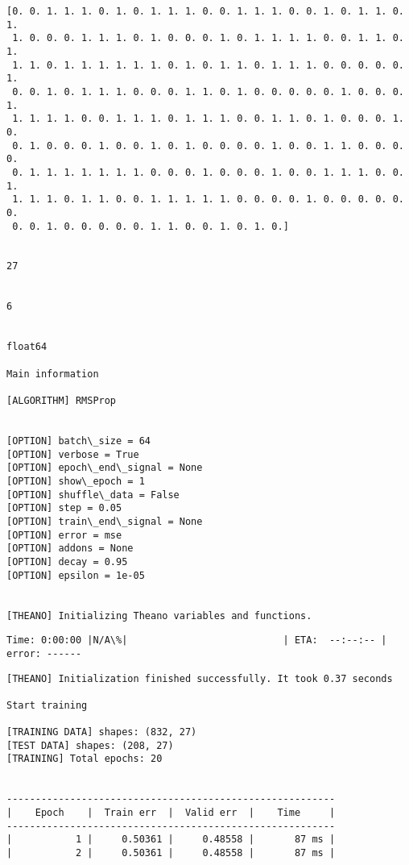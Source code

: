 \documentclass[11pt]{article}
\begin{document}
\begin{Verbatim}[commandchars=\\\{\}]
[0. 0. 1. 1. 1. 0. 1. 0. 1. 1. 1. 0. 0. 1. 1. 1. 0. 0. 1. 0. 1. 1. 0. 1.
 1. 0. 0. 0. 1. 1. 1. 0. 1. 0. 0. 0. 1. 0. 1. 1. 1. 1. 0. 0. 1. 1. 0. 1.
 1. 1. 0. 1. 1. 1. 1. 1. 1. 0. 1. 0. 1. 1. 0. 1. 1. 1. 0. 0. 0. 0. 0. 1.
 0. 0. 1. 0. 1. 1. 1. 0. 0. 0. 1. 1. 0. 1. 0. 0. 0. 0. 0. 1. 0. 0. 0. 1.
 1. 1. 1. 1. 0. 0. 1. 1. 1. 0. 1. 1. 1. 0. 0. 1. 1. 0. 1. 0. 0. 0. 1. 0.
 0. 1. 0. 0. 0. 1. 0. 0. 1. 0. 1. 0. 0. 0. 0. 1. 0. 0. 1. 1. 0. 0. 0. 0.
 0. 1. 1. 1. 1. 1. 1. 1. 0. 0. 0. 1. 0. 0. 0. 1. 0. 0. 1. 1. 1. 0. 0. 1.
 1. 1. 1. 0. 1. 1. 0. 0. 1. 1. 1. 1. 1. 0. 0. 0. 0. 1. 0. 0. 0. 0. 0. 0.
 0. 0. 1. 0. 0. 0. 0. 0. 1. 1. 0. 0. 1. 0. 1. 0.]


27


6


float64

Main information

[ALGORITHM] RMSProp


[OPTION] batch\_size = 64
[OPTION] verbose = True
[OPTION] epoch\_end\_signal = None
[OPTION] show\_epoch = 1
[OPTION] shuffle\_data = False
[OPTION] step = 0.05
[OPTION] train\_end\_signal = None
[OPTION] error = mse
[OPTION] addons = None
[OPTION] decay = 0.95
[OPTION] epsilon = 1e-05


[THEANO] Initializing Theano variables and functions.

    \end{Verbatim}

    \begin{Verbatim}[commandchars=\\\{\}]
Time: 0:00:00 |N/A\%|                           | ETA:  --:--:-- | error: ------
    \end{Verbatim}

    \begin{Verbatim}[commandchars=\\\{\}]
[THEANO] Initialization finished successfully. It took 0.37 seconds

Start training

[TRAINING DATA] shapes: (832, 27)
[TEST DATA] shapes: (208, 27)
[TRAINING] Total epochs: 20


---------------------------------------------------------
|    Epoch    |  Train err  |  Valid err  |    Time     |
---------------------------------------------------------
|           1 |     0.50361 |     0.48558 |       87 ms |
|           2 |     0.50361 |     0.48558 |       87 ms |

    \end{Verbatim}
\end{document}
